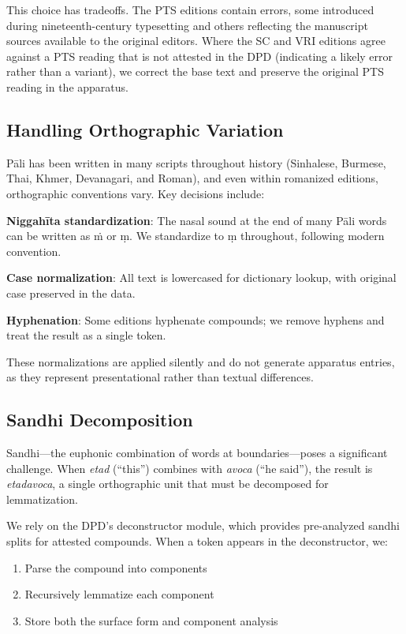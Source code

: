 \documentclass[12pt]{article}
\begin{document}
This choice has tradeoffs. The PTS editions contain errors, some introduced during nineteenth-century typesetting and others reflecting the manuscript sources available to the original editors. Where the SC and VRI editions agree against a PTS reading that is not attested in the DPD (indicating a likely error rather than a variant), we correct the base text and preserve the original PTS reading in the apparatus.

\subsection{Handling Orthographic Variation}

Pāli has been written in many scripts throughout history (Sinhalese, Burmese, Thai, Khmer, Devanagari, and Roman), and even within romanized editions, orthographic conventions vary. Key decisions include:

\textbf{Niggahīta standardization}: The nasal sound at the end of many Pāli words can be written as ṁ or ṃ. We standardize to ṃ throughout, following modern convention.

\textbf{Case normalization}: All text is lowercased for dictionary lookup, with original case preserved in the data.

\textbf{Hyphenation}: Some editions hyphenate compounds; we remove hyphens and treat the result as a single token.

These normalizations are applied silently and do not generate apparatus entries, as they represent presentational rather than textual differences.

\subsection{Sandhi Decomposition}

Sandhi---the euphonic combination of words at boundaries---poses a significant challenge. When \textit{etad} (``this'') combines with \textit{avoca} (``he said''), the result is \textit{etadavoca}, a single orthographic unit that must be decomposed for lemmatization.

We rely on the DPD's deconstructor module, which provides pre-analyzed sandhi splits for attested compounds. When a token appears in the deconstructor, we:

\begin{enumerate}
\item Parse the compound into components
\item Recursively lemmatize each component
\item Store both the surface form and component analysis
\end{enumerate}
\end{document}
